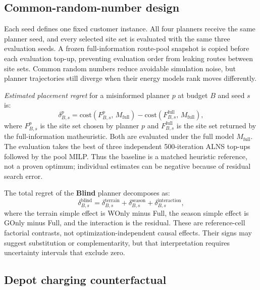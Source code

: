 \documentclass[review,3p,authoryear]{elsarticle}
\begin{document}
\subsection{Common-random-number design}
\label{sec:crn}

Each seed defines one fixed customer instance.  All four planners receive
the same planner seed, and every selected site set is evaluated with the
same three evaluation seeds.  A frozen full-information route-pool snapshot
is copied before each evaluation top-up, preventing evaluation order from
leaking routes between site sets.  Common random numbers reduce avoidable
simulation noise, but planner trajectories still diverge when their energy
models rank moves differently.

\emph{Estimated placement regret} for a misinformed planner $p$ at budget
$B$ and seed $s$ is:
\begin{equation}
  \delta^p_{B,s} = \text{cost}(F^p_{B,s},\,M_{\text{full}})
    - \text{cost}(F^{\text{full}}_{B,s},\,M_{\text{full}}),
  \label{eq:regret}
\end{equation}
where $F^p_{B,s}$ is the site set chosen by planner $p$ and
$F^{\text{full}}_{B,s}$ is the site set returned by the full-information
matheuristic.  Both are evaluated under the full model $M_{\text{full}}$.
The evaluation takes the best of three independent 500-iteration ALNS
top-ups followed by the pool MILP.  Thus the baseline is a matched heuristic
reference, not a proven optimum; individual estimates can be negative
because of residual search error.

The total regret of the \textbf{Blind} planner decomposes as:
\begin{equation}
  \delta^{\text{blind}}_{B,s}
    = \delta^{\text{terrain}}_{B,s}
    + \delta^{\text{season}}_{B,s}
    + \delta^{\text{interaction}}_{B,s},
  \label{eq:regret_decomp}
\end{equation}
where the terrain simple effect is WOnly minus Full, the season simple
effect is GOnly minus Full, and the interaction is the residual.  These are
reference-cell factorial contrasts, not optimization-independent causal
effects.  Their signs may suggest substitution or complementarity, but that
interpretation requires uncertainty intervals that exclude zero.

\subsection{Depot charging counterfactual}
\label{sec:depot}
\end{document}
